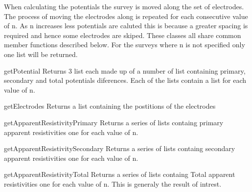 When calculating the potentials the survey is moved along the set of electrodes.
The process of moving the electrodes along is repeated for each consecutive value of n.
As n increases less potentials are caluted this is because a greater spacing is
required and hence some electrodes are skiped. 
These classes all share common member functions described below. For the surveys
where n is not specified only one list will be returned. 

\begin{methoddesc}[]{getPotential}{}
Returns 3 list each made up of a number of list containing primary, secondary and total
potentials diferences. Each of the lists contain a list for each value of n.
\end{methoddesc}

\begin{methoddesc}[]{getElectrodes}{}
Returns a list containing the postitions of the electrodes
\end{methoddesc}

\begin{methoddesc}[]{getApparentResistivityPrimary}{}
Returns a series of lists containg primary apparent resistivities one for each 
value of n.
\end{methoddesc}

\begin{methoddesc}[]{getApparentResistivitySecondary}{}
Returns a series of lists containg secondary apparent resistivities one for each 
value of n.
\end{methoddesc}

\begin{methoddesc}[]{getApparentResistivityTotal}{}
Returns a series of lists containg Total apparent resistivities one for each 
value of n. This is generaly the result of intrest.
\end{methoddesc}
